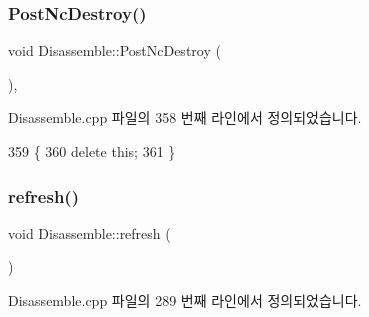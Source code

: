 \subsubsection{\texorpdfstring{Post\+Nc\+Destroy()}{PostNcDestroy()}}
{\footnotesize\ttfamily void Disassemble\+::\+Post\+Nc\+Destroy (\begin{DoxyParamCaption}{ }\end{DoxyParamCaption})\hspace{0.3cm}{\ttfamily [protected]}, {\ttfamily [virtual]}}



Disassemble.\+cpp 파일의 358 번째 라인에서 정의되었습니다.


\begin{DoxyCode}
359 \{
360   \textcolor{keyword}{delete} \textcolor{keyword}{this};
361 \}
\end{DoxyCode}
\mbox{\label{class_disassemble_a7cdf11d53ce0f170ad7dd8fc66961805}} 
\subsubsection{\texorpdfstring{refresh()}{refresh()}}
{\footnotesize\ttfamily void Disassemble\+::refresh (\begin{DoxyParamCaption}{ }\end{DoxyParamCaption})}



Disassemble.\+cpp 파일의 289 번째 라인에서 정의되었습니다.


